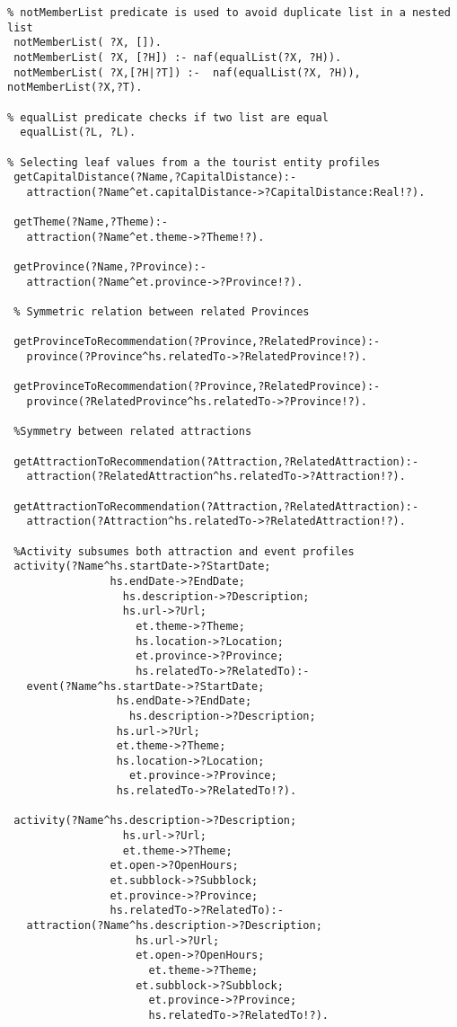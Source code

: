 \begin{verbatim}
% notMemberList predicate is used to avoid duplicate list in a nested list
 notMemberList( ?X, []).
 notMemberList( ?X, [?H]) :- naf(equalList(?X, ?H)).
 notMemberList( ?X,[?H|?T]) :-  naf(equalList(?X, ?H)), notMemberList(?X,?T).
 
% equalList predicate checks if two list are equal
  equalList(?L, ?L).

% Selecting leaf values from a the tourist entity profiles
 getCapitalDistance(?Name,?CapitalDistance):-
   attraction(?Name^et.capitalDistance->?CapitalDistance:Real!?).

 getTheme(?Name,?Theme):-
   attraction(?Name^et.theme->?Theme!?).  

 getProvince(?Name,?Province):-
   attraction(?Name^et.province->?Province!?).
  
 % Symmetric relation between related Provinces 

 getProvinceToRecommendation(?Province,?RelatedProvince):-
   province(?Province^hs.relatedTo->?RelatedProvince!?).
  
 getProvinceToRecommendation(?Province,?RelatedProvince):-
   province(?RelatedProvince^hs.relatedTo->?Province!?).

 %Symmetry between related attractions

 getAttractionToRecommendation(?Attraction,?RelatedAttraction):-
   attraction(?RelatedAttraction^hs.relatedTo->?Attraction!?).

 getAttractionToRecommendation(?Attraction,?RelatedAttraction):-
   attraction(?Attraction^hs.relatedTo->?RelatedAttraction!?).
   
 %Activity subsumes both attraction and event profiles
 activity(?Name^hs.startDate->?StartDate;
                hs.endDate->?EndDate; 
	              hs.description->?Description; 
	              hs.url->?Url; 
		            et.theme->?Theme;  
		            hs.location->?Location;  
		            et.province->?Province;  
		            hs.relatedTo->?RelatedTo):-
   event(?Name^hs.startDate->?StartDate;  
	             hs.endDate->?EndDate; 
		           hs.description->?Description; 
	             hs.url->?Url; 
	             et.theme->?Theme;  
	             hs.location->?Location;  
		           et.province->?Province;  
	             hs.relatedTo->?RelatedTo!?).

 activity(?Name^hs.description->?Description; 
	              hs.url->?Url; 
	              et.theme->?Theme;  
                et.open->?OpenHours;
                et.subblock->?Subblock;  
                et.province->?Province;  
                hs.relatedTo->?RelatedTo):-
   attraction(?Name^hs.description->?Description; 
                    hs.url->?Url; 
                    et.open->?OpenHours;
	                  et.theme->?Theme; 
                    et.subblock->?Subblock;  
	                  et.province->?Province;  
	                  hs.relatedTo->?RelatedTo!?).
\end{verbatim}

